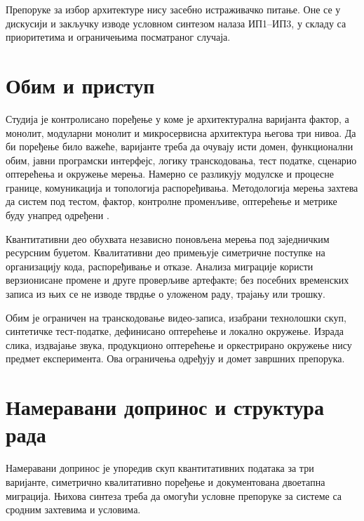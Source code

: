 \documentclass[12pt,oneside]{memoir}
\begin{document}
Препоруке за избор архитектуре нису засебно истраживачко питање. Оне се у
дискусији и закључку изводе условном синтезом налаза ИП1--ИП3, у складу са
приоритетима и ограничењима посматраног случаја.

\section{Обим и приступ}

Студија је контролисано поређење у коме је архитектурална варијанта фактор, а
монолит, модуларни монолит и микросервисна архитектура његова три нивоа.
Да би поређење било важеће, варијанте треба да очувају исти домен,
функционални обим, јавни програмски интерфејс, логику транскодовања, тест
податке, сценарио оптерећења и окружење мерења.
Намерно се разликују модулске и процесне границе, комуникација и топологија
распоређивања. Методологија мерења захтева да систем под тестом, фактор,
контролне променљиве, оптерећење и метрике буду унапред одређени
\cite{jain1991art,kounev2020benchmarking}.

Квантитативни део обухвата независно поновљена мерења под заједничким
ресурсним буџетом. Квалитативни део примењује симетричне поступке на
организацију кода, распоређивање и отказе. Анализа миграције користи
верзионисане промене и друге проверљиве артефакте; без посебних временских
записа из њих се не изводе тврдње о уложеном раду, трајању или трошку.

Обим је ограничен на транскодовање видео-записа, изабрани технолошки скуп,
синтетичке тест-податке, дефинисано оптерећење и локално окружење. Израда
слика, издвајање звука, продукционо оптерећење и оркестрирано окружење нису
предмет експеримента. Ова ограничења одређују и домет завршних препорука.

\section{Намеравани допринос и структура рада}

Намеравани допринос је упоредив скуп квантитативних података за три варијанте,
симетрично квалитативно поређење и документована двоетапна миграција. Њихова
синтеза треба да омогући условне препоруке за системе са сродним захтевима и
условима.

\end{document}
